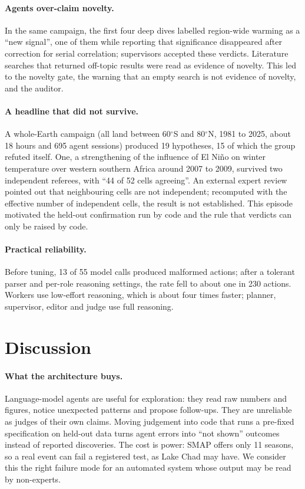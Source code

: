 \documentclass[11pt,a4paper]{article}
\begin{document}
\paragraph{Agents over-claim novelty.} In the same campaign, the first four deep dives labelled region-wide warming as a
``new signal'', one of them while reporting that significance disappeared after correction for serial correlation;
supervisors accepted these verdicts. Literature searches that returned off-topic results were read as evidence of
novelty. This led to the novelty gate, the warning that an empty search is not evidence of novelty, and the auditor.

\paragraph{A headline that did not survive.} A whole-Earth campaign (all land between 60$^\circ$S and 80$^\circ$N,
1981 to 2025, about 18 hours and 695 agent sessions) produced 19 hypotheses, 15 of which the group refuted itself. One,
a strengthening of the influence of El Ni\~no on winter temperature over western southern Africa around 2007 to 2009,
survived two independent referees, with ``44 of 52 cells agreeing''. An external expert review pointed out that
neighbouring cells are not independent; recomputed with the effective number of independent cells, the result is not
established. This episode motivated the held-out confirmation run by code and the rule that verdicts can only be
raised by code.

\paragraph{Practical reliability.} Before tuning, 13 of 55 model calls produced malformed actions; after a tolerant
parser and per-role reasoning settings, the rate fell to about one in 230 actions. Workers use low-effort reasoning,
which is about four times faster; planner, supervisor, editor and judge use full reasoning.

\section{Discussion}
\label{sec:discussion}

\paragraph{What the architecture buys.} Language-model agents are useful for exploration: they read raw numbers and
figures, notice unexpected patterns and propose follow-ups. They are unreliable as judges of their own claims. Moving
judgement into code that runs a pre-fixed specification on held-out data turns agent errors into ``not shown''
outcomes instead of reported discoveries. The cost is power: SMAP offers only 11 seasons, so a real event can fail a
registered test, as Lake Chad may have. We consider this the right failure mode for an automated system whose output
may be read by non-experts.
\end{document}
